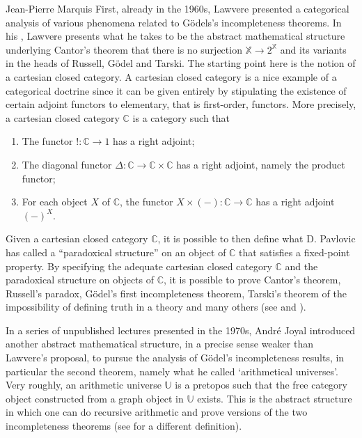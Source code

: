 \begin{artengenv}{Jean-Pierre Marquis}
First, already in the 1960s, Lawvere presented a categorical analysis of various phenomena related to Gödels's incompleteness theorems. In his \parencite*{Lawvere1969b}, Lawvere presents what he takes to be the abstract mathematical structure underlying Cantor's theorem that there is no surjection $\mathbb{X} \to 2^{\mathbb{X}}$ and its variants in the heads of Russell, Gödel and Tarski. The starting point here is the notion of a cartesian closed category. A cartesian closed category is a nice example of a categorical doctrine since it can be given entirely by stipulating the existence of certain adjoint functors to elementary, that is first-order, functors. More precisely, a cartesian closed category $\mathbb{C}$ is a category such that 
\begin{enumerate}
	\item The functor $! : \mathbb{C} \to 1$ has a right adjoint;
	\item The diagonal functor $\Delta : \mathbb{C} \to \mathbb{C} \times \mathbb{C}$ has a right adjoint, namely the product functor;
	\item For each object $X$ of $\mathbb{C}$, the functor $X \times (-) : \mathbb{C} \to \mathbb{C}$ has a right adjoint $(-)^X$.
\end{enumerate}

Given a cartesian closed category $\mathbb{C}$, it is possible to then define what D. Pavlovic has called a ``paradoxical structure'' on an object of $\mathbb{C}$ that satisfies a fixed-point property. By specifying the adequate cartesian closed category $\mathbb{C}$ and the paradoxical structure on objects of $\mathbb{C}$, it is possible to prove Cantor's theorem, Russell's paradox, Gödel's first incompleteness theorem, Tarski's theorem of the impossibility of defining truth in a theory and many others (see \cite{Pavlovic1992} and \cite{Yanofsky2003}).

In a series of unpublished lectures presented in the 1970s, André Joyal introduced another abstract mathematical structure, in a precise sense weaker than Lawvere's proposal, to pursue the analysis of Gödel's incompleteness results, in particular the second theorem, namely what he called `arithmetical universes'. Very roughly, an arithmetic universe $\mathbb{U}$ is a pretopos such that the free category object constructed from a graph object in $\mathbb{U}$ exists. This is the abstract structure in which one can do recursive arithmetic and prove versions of the two incompleteness theorems (see \cite{Maietti2010} for a different definition).


\end{artengenv}

